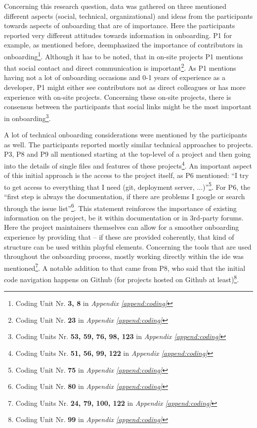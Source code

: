 Concerning this research question, data was gathered on three mentioned different aspects (social, technical, organizational) and ideas from the participants towards aspects of onboarding that are of importance. Here the participants reported very different attitudes towards information in onboarding. P1 for example, as mentioned before, deemphasized the importance of contributors in onboarding\footnote{Coding Unit Nr. \textbf{3, 8} in \textit{Appendix \ref{append:coding}}}. Although it has to be noted, that in on-site projects P1 mentions that social contact and direct communication is important\footnote{Coding Unit Nr. \textbf{23} in \textit{Appendix \ref{append:coding}}}. As P1 mentions having not a lot of onboarding occasions and 0-1 years of experience as a developer, P1 might either see contributors not as direct colleagues or has more experience with on-site projects. Concerning these on-site projects, there is consensus between the participants that social links might be the most important in onboarding\footnote{Coding Units Nr. \textbf{53, 59, 76, 98, 123} in \textit{Appendix \ref{append:coding}}}.

A lot of technical onboarding considerations were mentioned by the participants as well. The participants reported mostly similar technical approaches to projects. P3, P8 and P9 all mentioned starting at the top-level of a project and then going into the details of single files and features of these projects\footnote{Coding Units Nr. \textbf{51, 56, 99, 122} in \textit{Appendix \ref{append:coding}}}. An important aspect of this initial approach is the access to the project itself, as P6 mentioned: \enquote{I try to get access to everything that I need (git, deployment server, ...)}\footnote{Coding Unit Nr. \textbf{75} in \textit{Appendix \ref{append:coding}}}. For P6, the \enquote{first step is always the documentation, if there are problems I google or search through the issue list}\footnote{Coding Unit Nr. \textbf{80} in \textit{Appendix \ref{append:coding}}}. This statement reinforces the importance of existing information on the project, be it within documentation or in 3rd-party forums. Here the project maintainers themselves can allow for a smoother onboarding experience by providing that -- if these are provided coherently, that kind of structure can be used within playful elements. Concerning the tools that are used throughout the onboarding process, mostly working directly within the \gls{ide} was mentioned\footnote{Coding Units Nr. \textbf{24, 79, 100, 122} in \textit{Appendix \ref{append:coding}}}. A notable addition to that came from P8, who said that the initial code navigation happens on Github (for projects hosted on Github at least)\footnote{Coding Unit Nr. \textbf{99} in \textit{Appendix \ref{append:coding}}}.

